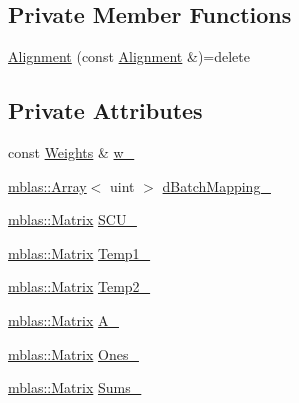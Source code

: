 \subsection*{Private Member Functions}
\begin{DoxyCompactItemize}
\item 
\hyperlink{classamunmt_1_1GPU_1_1Decoder_1_1Alignment_a027ea50b30f3251069c35ec2ee64b68b}{Alignment} (const \hyperlink{classamunmt_1_1GPU_1_1Decoder_1_1Alignment}{Alignment} \&)=delete
\end{DoxyCompactItemize}
\subsection*{Private Attributes}
\begin{DoxyCompactItemize}
\item 
const \hyperlink{structamunmt_1_1GPU_1_1Weights}{Weights} \& \hyperlink{classamunmt_1_1GPU_1_1Decoder_1_1Alignment_a76259ec6506c944eb14b820b507be817}{w\+\_\+}
\item 
\hyperlink{classamunmt_1_1GPU_1_1mblas_1_1Array}{mblas\+::\+Array}$<$ uint $>$ \hyperlink{classamunmt_1_1GPU_1_1Decoder_1_1Alignment_ab90a6f08ed51961ec0e95125a3024ac8}{d\+Batch\+Mapping\+\_\+}
\item 
\hyperlink{namespaceamunmt_1_1GPU_1_1mblas_ab67821a8254de53e45a623cf73c0aef6}{mblas\+::\+Matrix} \hyperlink{classamunmt_1_1GPU_1_1Decoder_1_1Alignment_ac209ca675c6170b4eb433d4ec323ed37}{S\+C\+U\+\_\+}
\item 
\hyperlink{namespaceamunmt_1_1GPU_1_1mblas_ab67821a8254de53e45a623cf73c0aef6}{mblas\+::\+Matrix} \hyperlink{classamunmt_1_1GPU_1_1Decoder_1_1Alignment_ab9dd63a8ff8558c4be5a1edb595444a9}{Temp1\+\_\+}
\item 
\hyperlink{namespaceamunmt_1_1GPU_1_1mblas_ab67821a8254de53e45a623cf73c0aef6}{mblas\+::\+Matrix} \hyperlink{classamunmt_1_1GPU_1_1Decoder_1_1Alignment_a436ddfe4e64a8f9d2e088c62743d4e30}{Temp2\+\_\+}
\item 
\hyperlink{namespaceamunmt_1_1GPU_1_1mblas_ab67821a8254de53e45a623cf73c0aef6}{mblas\+::\+Matrix} \hyperlink{classamunmt_1_1GPU_1_1Decoder_1_1Alignment_a1bff435fc752946c60aaec9bdda999cf}{A\+\_\+}
\item 
\hyperlink{namespaceamunmt_1_1GPU_1_1mblas_ab67821a8254de53e45a623cf73c0aef6}{mblas\+::\+Matrix} \hyperlink{classamunmt_1_1GPU_1_1Decoder_1_1Alignment_a86103e1e592a30bfe7efc705ee3779ed}{Ones\+\_\+}
\item 
\hyperlink{namespaceamunmt_1_1GPU_1_1mblas_ab67821a8254de53e45a623cf73c0aef6}{mblas\+::\+Matrix} \hyperlink{classamunmt_1_1GPU_1_1Decoder_1_1Alignment_ada54a344803a2df414eea80f596a568d}{Sums\+\_\+}
\end{DoxyCompactItemize}


